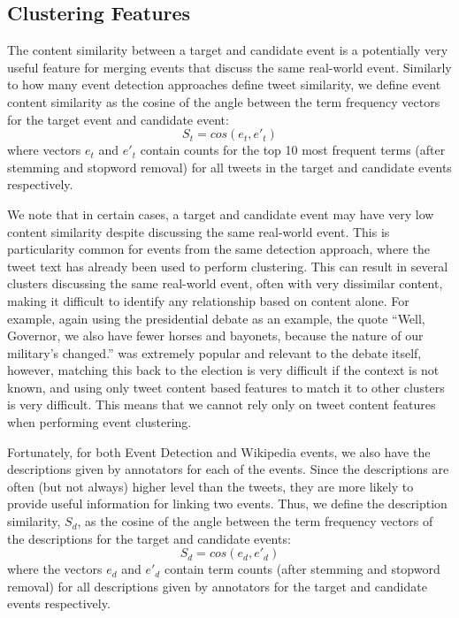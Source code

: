 
\subsection{Clustering Features}
\label{collection:clustering}

The content similarity between a target and candidate event is a potentially very useful feature for merging events that discuss the same real-world event.
Similarly to how many event detection approaches define tweet similarity, we define event content similarity as the cosine of the angle between the term frequency vectors for the target event and candidate event:
\begin{equation}
	S_t = cos(e_t, e'_t)
\end{equation}
where vectors $e_t$ and $e'_t$ contain counts for the top 10 most frequent terms (after stemming and stopword removal) for all tweets in the target and candidate events respectively.

We note that in certain cases, a target and candidate event may have very low content similarity despite discussing the same real-world event.
This is particularity common for events from the same detection approach, where the tweet text has already been used to perform clustering.
This can result in several clusters discussing the same real-world event, often with very dissimilar content, making it difficult to identify any relationship based on content alone.
For example, again using the presidential debate as an example, the quote ``Well, Governor, we also have fewer horses and bayonets, because the nature of our military's changed.'' was extremely popular and relevant to the debate itself, however, matching this back to the election is very difficult if the context is not known, and using only tweet content based features to match it to other clusters is very difficult.
This means that we cannot rely only on tweet content features when performing event clustering.

Fortunately, for both Event Detection and Wikipedia events, we also have the  descriptions given by annotators for each of the events.
Since the descriptions are often (but not always) higher level than the tweets, they are more likely to provide useful information for linking two events.
Thus, we define the description similarity, $S_d$, as the cosine of the angle between the term frequency vectors of the descriptions for the target and candidate events:
\begin{equation}
	S_d = cos(e_d, e'_d)
\end{equation}
where the vectors $e_d$ and $e'_d$ contain term counts (after stemming and stopword removal) for all descriptions given by annotators for the target and candidate events respectively.

